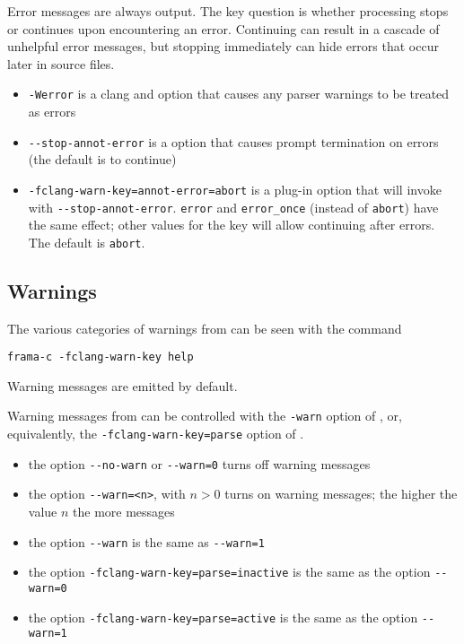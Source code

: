 Error messages are always output. 
The key question is whether processing stops or continues upon encountering an error. 
Continuing can result in a cascade of unhelpful error messages, but stopping immediately can hide errors that occur later in source files.
\begin{itemize}
\item \lstinline|-Werror| is a clang and \irg option that causes any parser warnings to be treated as errors
\item \lstinline|--stop-annot-error| is a \irg option that causes prompt termination on errors (the \irg default is to continue)
\item \lstinline|-fclang-warn-key=annot-error=abort| is a \fcl plug-in option that will invoke \irg with \lstinline|--stop-annot-error|.  \lstinline|error| and \lstinline|error_once| (instead of \lstinline|abort|) have the same effect; other values for the key will allow continuing after errors. The default is \texttt{abort}.
\end{itemize}

\subsection{Warnings}

The various categories of warnings from \fcl can be seen with the command \\ \centerline{\lstinline|frama-c -fclang-warn-key help|}
Warning messages are emitted by default.

Warning messages from \irg can be controlled with the \lstinline|-warn| option of \irg, or, equivalently, the \lstinline|-fclang-warn-key=parse| option of \fc.

\begin{itemize}
\item the \irg option \lstinline|--no-warn| or \lstinline|--warn=0| turns off \irg warning messages
\item the \irg option \lstinline|--warn=<n>|, with $n > 0$ turns on \irg warning messages; the higher the value $n$ the more messages
\item the \irg option \lstinline|--warn| is the same as \lstinline|--warn=1|
\item the \fc option \lstinline|-fclang-warn-key=parse=inactive| is the same as the \irg option  \lstinline|--warn=0|
\item the \fc option \lstinline|-fclang-warn-key=parse=active| is the same as the \irg option  \lstinline|--warn=1|
\end{itemize}

